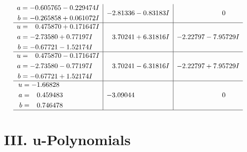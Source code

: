 \documentclass[1p]{elsarticle_modified}
\theoremstyle{definition}
\begin{document}
$$\begin{array}{c|c|c}
\begin{aligned}
a &= -0.605765 - 0.229474 I \\
b &= -0.265858 + 0.061072 I\end{aligned}
 & -2.81336 - 0.83183 I & \phantom{-0.000000 } 0 \\ \hline\begin{aligned}
u &= \phantom{-}0.475870 + 0.171647 I \\
a &= -2.73580 + 0.77197 I \\
b &= -0.67721 - 1.52174 I\end{aligned}
 & \phantom{-}3.70241 + 6.31816 I & -2.22797 - 7.95729 I \\ \hline\begin{aligned}
u &= \phantom{-}0.475870 - 0.171647 I \\
a &= -2.73580 - 0.77197 I \\
b &= -0.67721 + 1.52174 I\end{aligned}
 & \phantom{-}3.70241 - 6.31816 I & -2.22797 + 7.95729 I \\ \hline\begin{aligned}
u &= -1.66828\phantom{ +0.000000I} \\
a &= \phantom{-}0.459483\phantom{ +0.000000I} \\
b &= \phantom{-}0.746478\phantom{ +0.000000I}\end{aligned}
 & -3.09044\phantom{ +0.000000I} & \phantom{-0.000000 } 0\\
 \hline 
 \end{array}$$\newpage
\newpage\renewcommand{\arraystretch}{1}
\centering \section*{ III. u-Polynomials}
\end{document}

